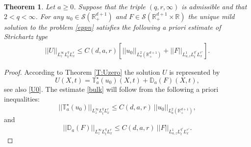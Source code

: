 \documentclass[11pt,letter]{amsart}
\def \RN {\mathbb{R}_+^{d+1}}
\def \R {\mathbb{R}}
\numberwithin{equation}{section}
\newtheorem{theorem}{Theorem}[section]
\numberwithin{equation}{section}
\begin{document}
\begin{theorem}\label{T:Tstarbulk}
Let $a\ge 0$. Suppose that the triple $(q,r,\infty)$ is admissible and that $2<q<\infty$. For any $u_0\in \mathscr S(\RN)$ and $F\in \mathscr S(\RN\times \R)$ the unique mild solution to the problem \eqref{eppn} satisfies the following a priori estimate of Strichartz type
\begin{align}\label{bulk}
||U||_{L^\infty_z L^q_t L^r_x } \le C(d,a,r)\left[||u_0||_{L^2_a(\RN)} + ||F||_{L^1_{a,z} L^{q'}_t L^{r'}_x }\right].
\end{align}
\end{theorem}

\begin{proof}
According to Theorem \ref{T:Uzero} the solution $U$ is represented by 
\begin{equation}\label{U00}
U(X,t) = \mathbb T^\star_a(u_0)(X,t) + \mathbb D_a(F)(X,t),
\end{equation}
see also \eqref{U0}. The estimate  \eqref{bulk} will follow from the following a priori inequalities:
\begin{equation}\label{bulk00}
||\mathbb T^\star_a(u_0)||_{L^\infty_z L^q_t L^r_x } \le C(d,a,r)\ ||u_0||_{L^2_a(\RN)},
\end{equation}
and 
\begin{equation}\label{Dabound}
||\mathbb D_a(F)||_{L^\infty_z L^q_t L^r_x } \le C(d,a,r)\  ||F||_{L^1_{a,z} L^{q'}_t L^{r'}_x }.
\end{equation}


\end{proof}
\end{document}

